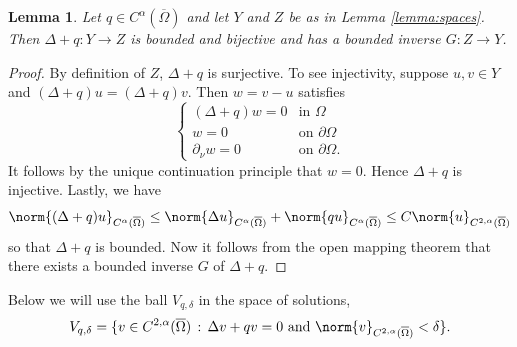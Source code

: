 \documentclass[11pt,a4paper]{amsart}
\newtheorem{Lemma}[Theorem]{Lemma}
\theoremstyle{definition}
\numberwithin{equation}{section}
\newcommand{\ol}[1]{\overline{#1}}
\newcommand{\p}{\partial}
\newcommand{\Om}{\Omega}
\begin{document}
\begin{Lemma}\label{lemma:schrödinger_bounded_inverse}
Let $q\in C^{\alpha}(\ol{\Om})$ and let $Y$ and $Z$ be as in Lemma \ref{lemma:spaces}.
Then $\Delta + q\colon Y\to Z$ is bounded and bijective and has a bounded inverse $G\colon Z \to Y$.
\end{Lemma}
\begin{proof}
By definition of $Z$, $\Delta+q$ is surjective.
To see injectivity, suppose $u,v\in Y$ and $(\Delta+q)u = (\Delta+q)v$.
Then $w=v-u$ satisfies
\begin{equation*}
\begin{cases}
	(\Delta+q)w = 0&\text{in }\Om \\
	w = 0&\text{on }\p\Om \\
	\p_{\nu}w = 0 &\text{on }\p\Om.
\end{cases}
\end{equation*}
It follows by the unique continuation principle that $w = 0$.
Hence $\Delta+q$ is injective. Lastly, we have
\begin{equation*}
	\norm{(\Delta+q)u}_{C^{\alpha}(\ol{\Om})} \leq \norm{\Delta u}_{C^{\alpha}(\ol{\Om})} + \norm{qu}_{C^{\alpha}(\ol{\Om})} \leq C\norm{u}_{C^{2,\alpha}(\ol{\Om})}
\end{equation*}
so that $\Delta+q$ is bounded.
Now it follows from the open mapping theorem that there exists a bounded inverse $G$ of $\Delta+q$.
\end{proof}

Below we will use the ball $V_{q,\delta}$ in the space of solutions,
\[
V_{q,\delta} = \{ v \in C^{2,\alpha}(\ol{\Om}) \,:\, \Delta v + qv = 0 \text{ and } \norm{v}_{C^{2,\alpha}(\ol{\Om})} < \delta \}.
\]
\end{document}
